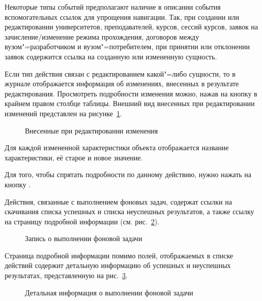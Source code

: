 Некоторые типы событий предполагают наличие в описании события вспомогательных ссылок для упрощения навигации. 
Так, при создании или редактировании университетов, преподавателей, курсов, сессий курсов, 
заявок на зачисление/изменение режима прохождения, договоров между вузом"=разработчиком и вузом"=потребителем,
при принятии или отклонении заявок содержится ссылка на созданную или измененную сущность.


Если тип действия связан с редактированием какой"=либо сущности, то в журнале отображается информация об изменениях, 
внесенных в результате редактирования. Просмотреть подробности изменения можно, 
нажав на кнопку  в крайнем правом столбце таблицы.
Внешний вид внесенных при редактировании изменений представлен на рисунке~\ref{img:employee:log_diff}.
\begin{figure}[H]
	\caption{Внесенные при редактировании изменения}
	\label{img:employee:log_diff}
\end{figure}

Для каждой измененной характеристики объекта отображается название характеристики, её старое и новое значение.

Для того, чтобы спрятать подробности по данному действию, нужно нажать на кнопку .

Действия, связанные с выполнением фоновых задач, содержат ссылки на скачивания списка успешных и 
списка неуспешных результатов, а также ссылку на страницу подробной информации 
(см. рис.~\ref{img:employee:log_mass_async_task_list}).

\begin{figure}[H]
	\caption{Запись о выполнении фоновой задачи}
	\label{img:employee:log_mass_async_task_list}
\end{figure}

Страница подробной информации помимо полей, отображаемых в списке действий содержит детальную информацию 
об успешных и неуспешных результатах, представленную на рис.~\ref{img:employee:log_mass_async_task_detail}. 

\begin{figure}[H]
	\caption{Детальная информация о выполнении фоновой задачи}
	\label{img:employee:log_mass_async_task_detail}
\end{figure}



